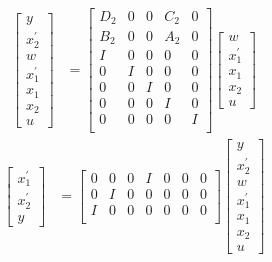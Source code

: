 \documentclass[a4paper,twoside,10pt,english]{report}
\begin{document}
\begin{align*}
\left[\begin{array}{c}
y\\
x^{\prime}_{2}\\
w\\
x^{\prime}_{1}\\
x_{1}\\ 
x_{2}\\
u
\end{array}\right]
&= 
\left[\begin{array}{ccccc}
D_{2} & 0 & 0 & C_{2} & 0 \\
B_{2} & 0 & 0 & A_{2} & 0 \\
I & 0 & 0 & 0 & 0\\
0 & I & 0 & 0 & 0\\
0 & 0 & I & 0 & 0\\
0 & 0 & 0 & I & 0\\
0 & 0 & 0 & 0 & I\\
\end{array}\right]
\left[\begin{array}{c}
w\\
x^{\prime}_{1}\\
x_{1}\\ 
x_{2}\\
u
\end{array}\right] 
\end{align*}
\begin{align*}
\left[\begin{array}{c}
x^{\prime}_{1}\\
x^{\prime}_{2}\\
y
\end{array}\right]
&= 
\left[\begin{array}{ccccccc}
0 & 0 & 0 & I & 0 & 0 & 0\\
0 & I & 0 & 0 & 0 & 0 & 0\\
I & 0 & 0 & 0 & 0 & 0 & 0\\
\end{array}\right]
\left[\begin{array}{c}
y\\
x^{\prime}_{2}\\
w\\
x^{\prime}_{1}\\
x_{1}\\ 
x_{2}\\
u
\end{array}\right] 
\end{align*}
\end{document}
